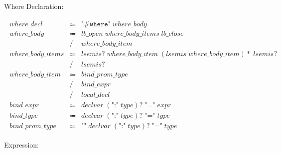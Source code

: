 Where Declaration:

\begin{align*}
    \begin{array}{rcll}
        \mathit{where\_decl}
        &\Coloneq &\texttt{"\#where"}\; \mathit{where\_body} \\
        \mathit{where\_body}
        &\Coloneq &\mathit{lb\_open}\; \mathit{where\_body\_items}\; \mathit{lb\_close} \\
        &\mathrel{/} &\mathit{where\_body\_item} \\
        \mathit{where\_body\_items}
        &\Coloneq &\mathit{lsemis}{?}\; \mathit{where\_body\_item}\; (\mathit{lsemis}\; \mathit{where\_body\_item}){*}\; \mathit{lsemis}{?} \\
        &\mathrel{/} &\mathit{lsemis}{?} \\
        \mathit{where\_body\_item}
        &\Coloneq &\mathit{bind\_prom\_type} \\
        &\mathrel{/} &\mathit{bind\_expr} \\
        &\mathrel{/} &\mathit{local\_decl} \\
        \mathit{bind\_expr}
        &\Coloneq &\mathit{declvar}\; (\texttt{":"}\; \mathit{type}){?}\; \texttt{"="}\; \mathit{expr} \\
        \mathit{bind\_type}
        &\Coloneq &\mathit{declvar}\; (\texttt{":"}\; \mathit{type}){?}\; \texttt{"="}\; \mathit{type} \\
        \mathit{bind\_prom\_type}
        &\Coloneq &\texttt{"\^{}"}\; \mathit{declvar}\; (\texttt{":"}\; \mathit{type}){?}\; \texttt{"="}\; \mathit{type}
    \end{array}
\end{align*}

Expression:

